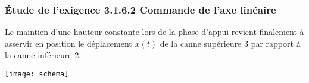 %  
%
%  
%  
%
%

\fi



\subsubsection*{Étude de l'exigence 3.1.6.2 \og Commande de l'axe linéaire\fg{}}
\ifprof
\else
 Le maintien d'une hauteur constante lors de la phase d'appui revient finalement à asservir en position le déplacement $x(t)$ de la canne supérieure 3 par rapport à la canne inférieure 2.

\begin{marginfigure}
\texttt{[image: schema]}
\end{marginfigure}


